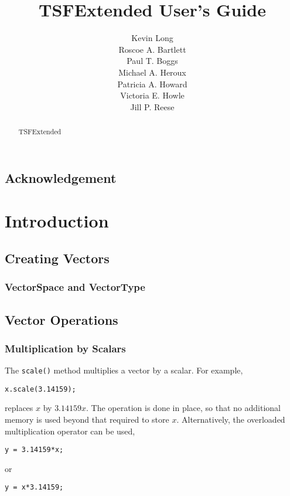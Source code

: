 \documentclass[12pt,relax]{SANDreport}
\title{TSFExtended User's Guide}
\author{Kevin Long\\
Roscoe A. Bartlett\\
Paul T. Boggs\\
Michael A. Heroux\\
Patricia A. Howard\\
Victoria E. Howle\\
Jill P. Reese
}
\date{} %
\begin{document}
\maketitle

\begin{abstract}
TSFExtended
\end{abstract}


\section*{Acknowledgement}


\clearpage
\tableofcontents
\listoffigures

\clearpage

\SANDmain
\chapter{Introduction}
\label{Section:Introduction}

\section{Creating Vectors}

\subsection{VectorSpace and VectorType}

\section{Vector Operations}

\subsection{Multiplication by Scalars}

The \verb+scale()+ method multiplies a vector by a scalar. For example,
\begin{verbatim}
x.scale(3.14159);
\end{verbatim}
replaces $x$ by $3.14159 x$. The operation is done in place, so that 
no additional memory is used beyond that required to store $x$. 
Alternatively, the overloaded multiplication operator can be used,
\begin{verbatim}
y = 3.14159*x;
\end{verbatim}
or
\begin{verbatim}
y = x*3.14159;
\end{verbatim}
\end{document}
